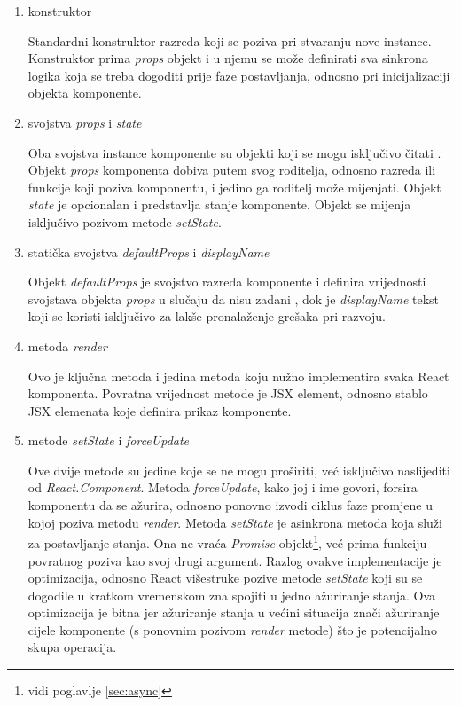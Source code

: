 \documentclass[times, utf8, diplomski, numeric]{fer}
\begin{document}
\begin{enumerate}[label=(\alph*)]

    \item konstruktor
    
    Standardni konstruktor razreda koji se poziva pri stvaranju nove instance. Konstruktor prima \emph{props} objekt i u njemu se može definirati sva sinkrona logika koja se treba dogoditi prije faze postavljanja, odnosno pri inicijalizaciji objekta komponente.

    \item svojstva \emph{props} i \emph{state}
    
    Oba svojstva instance komponente su objekti koji se mogu isključivo čitati .
    Objekt \emph{props} komponenta dobiva putem svog roditelja, odnosno razreda ili funkcije koji poziva komponentu, i jedino ga roditelj može mijenjati.
    Objekt \emph{state} je opcionalan i predstavlja stanje komponente. Objekt se mijenja isključivo pozivom metode \emph{setState}.

    \item statička svojstva \emph{defaultProps} i \emph{displayName}
    
    Objekt \emph{defaultProps} je svojstvo razreda komponente i definira vrijednosti svojstava objekta \emph{props} u slučaju da nisu zadani , dok je \emph{displayName} tekst koji se koristi isključivo za lakše pronalaženje grešaka pri razvoju.

    \item metoda \emph{render}
    
    Ovo je ključna metoda i jedina metoda koju nužno implementira svaka React komponenta. Povratna vrijednost metode je JSX element, odnosno stablo JSX elemenata koje definira prikaz komponente.

    \item metode \emph{setState} i \emph{forceUpdate}
    
    Ove dvije metode su jedine koje se ne mogu proširiti, već isključivo naslijediti od \emph{React.Component}.
    Metoda \emph{forceUpdate}, kako joj i ime govori, forsira komponentu da se ažurira, odnosno ponovno izvodi ciklus faze promjene u kojoj poziva metodu \emph{render}.
    Metoda \emph{setState} je asinkrona metoda koja služi za postavljanje stanja.
    Ona ne vraća \emph{Promise} objekt\footnote{vidi poglavlje \ref{sec:async}}, već prima funkciju povratnog poziva kao svoj drugi argument.
    Razlog ovakve implementacije je optimizacija, odnosno React višestruke pozive metode \emph{setState} koji su se dogodile u kratkom vremenskom zna spojiti u jedno ažuriranje stanja.
    Ova optimizacija je bitna jer ažuriranje stanja u većini situacija znači ažuriranje cijele komponente (s ponovnim pozivom \emph{render} metode) što je potencijalno skupa operacija.


\end{enumerate}
\end{document}
